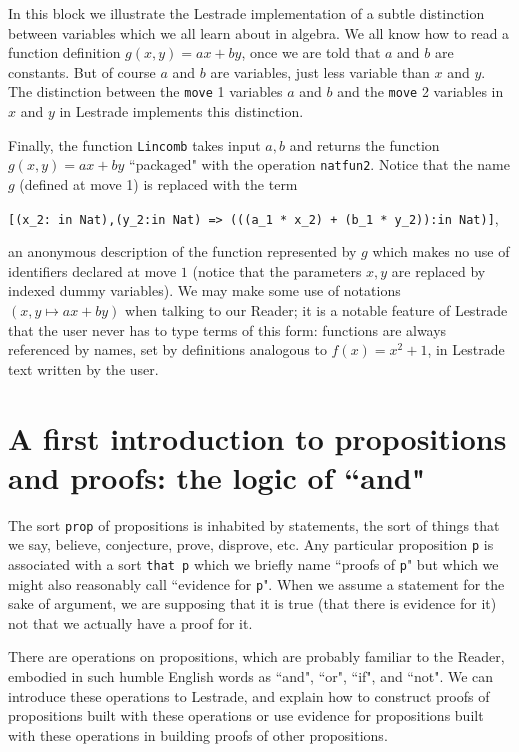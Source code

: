 \documentclass[12pt]{article}
\begin{document}
In this block we illustrate the Lestrade implementation of a subtle distinction between variables which we all learn about in algebra.  We all know how to read a function definition $g(x,y) = ax+by$, once we are told that $a$ and $b$ are constants.  But of course $a$ and $b$ are variables, just less variable than $x$ and $y$.  The distinction between the {\tt move} 1 variables $a$ and $b$ and the {\tt move} 2 variables in $x$ and $y$ in Lestrade implements this distinction.

Finally, the function {\tt Lincomb} takes input $a,b$ and returns the function $g(x,y)=ax+by$ ``packaged" with the operation {\tt natfun2}.  Notice that the name $g$ (defined at move 1) is replaced with the term \begin{center}{\tt [(x\_2: in Nat),(y\_2:in Nat) => (((a\_1 * x\_2) + (b\_1 * y\_2)):in Nat)]}, \end{center}an anonymous description of the function represented by $g$ which makes no use of identifiers declared at move $1$ (notice that the parameters $x,y$ are replaced by indexed dummy variables).  We may make some use of notations $(x,y \mapsto ax+by)$ when talking to our Reader; it is a notable feature of Lestrade that the user never has to type terms of this form:  functions are always referenced by names, set by definitions analogous to $f(x) = x^2+1$, in Lestrade text written by the user.

\newpage

\section{A first introduction to propositions and proofs:  the logic of ``and"}

The sort {\tt prop} of propositions is inhabited by statements, the sort of things that we say, believe, conjecture, prove, disprove, etc.   Any particular proposition {\tt p} is associated with a sort {\tt that p} which we briefly name ``proofs of {\tt p}" but which we might also reasonably call
``evidence for {\tt p}".   When we assume a statement for the sake of argument, we are supposing that it is true (that there is evidence for it) not that we actually have a proof for it.

There are operations on propositions, which are probably familiar to the Reader, embodied in such humble English words as ``and", ``or", ``if", and ``not".
We can introduce these operations to Lestrade, and explain how to construct proofs of propositions built with these operations or use evidence for propositions built with these operations in building proofs of other propositions.
\end{document}
